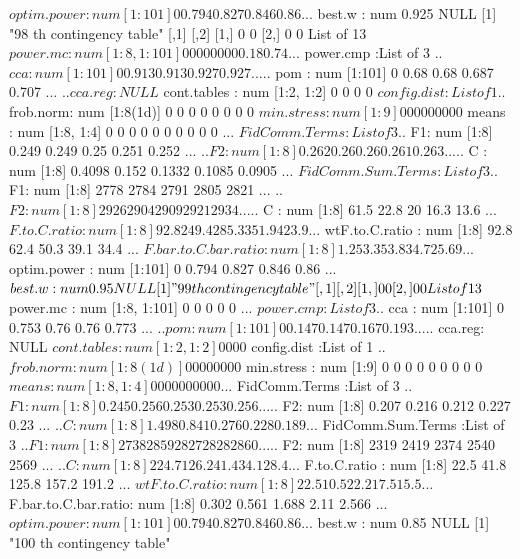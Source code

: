 \documentclass[11pt]{article} %
\begin{document}
\begin{Schunk}
\begin{Soutput}
 $ optim.power         : num [1:101] 0 0.794 0.827 0.846 0.86 ...
 $ best.w              : num 0.925
NULL
[1] "98 th contingency table"
     [,1] [,2]
[1,]    0    0
[2,]    0    0
List of 13
 $ power.mc            : num [1:8, 1:101] 0 0 0 0 0 0 0 0 0.18 0.74 ...
 $ power.cmp           :List of 3
  ..$ cca    : num [1:101] 0 0.913 0.913 0.927 0.927 ...
  ..$ pom    : num [1:101] 0 0.68 0.68 0.687 0.707 ...
  ..$ cca.reg: NULL
 $ cont.tables         : num [1:2, 1:2] 0 0 0 0
 $ config.dist         :List of 1
  ..$ frob.norm: num [1:8(1d)] 0 0 0 0 0 0 0 0
 $ min.stress          : num [1:9] 0 0 0 0 0 0 0 0 0
 $ means               : num [1:8, 1:4] 0 0 0 0 0 0 0 0 0 0 ...
 $ FidComm.Terms       :List of 3
  ..$ F1: num [1:8] 0.249 0.249 0.25 0.251 0.252 ...
  ..$ F2: num [1:8] 0.262 0.26 0.26 0.261 0.263 ...
  ..$ C : num [1:8] 0.4098 0.152 0.1332 0.1085 0.0905 ...
 $ FidComm.Sum.Terms   :List of 3
  ..$ F1: num [1:8] 2778 2784 2791 2805 2821 ...
  ..$ F2: num [1:8] 2926 2904 2909 2921 2934 ...
  ..$ C : num [1:8] 61.5 22.8 20 16.3 13.6 ...
 $ F.to.C.ratio        : num [1:8] 92.8 249.4 285.3 351.9 423.9 ...
 $ wtF.to.C.ratio      : num [1:8] 92.8 62.4 50.3 39.1 34.4 ...
 $ F.bar.to.C.bar.ratio: num [1:8] 1.25 3.35 3.83 4.72 5.69 ...
 $ optim.power         : num [1:101] 0 0.794 0.827 0.846 0.86 ...
 $ best.w              : num 0.95
NULL
[1] "99 th contingency table"
     [,1] [,2]
[1,]    0    0
[2,]    0    0
List of 13
 $ power.mc            : num [1:8, 1:101] 0 0 0 0 0 ...
 $ power.cmp           :List of 3
  ..$ cca    : num [1:101] 0 0.753 0.76 0.76 0.773 ...
  ..$ pom    : num [1:101] 0 0.147 0.147 0.167 0.193 ...
  ..$ cca.reg: NULL
 $ cont.tables         : num [1:2, 1:2] 0 0 0 0
 $ config.dist         :List of 1
  ..$ frob.norm: num [1:8(1d)] 0 0 0 0 0 0 0 0
 $ min.stress          : num [1:9] 0 0 0 0 0 0 0 0 0
 $ means               : num [1:8, 1:4] 0 0 0 0 0 0 0 0 0 0 ...
 $ FidComm.Terms       :List of 3
  ..$ F1: num [1:8] 0.245 0.256 0.253 0.253 0.256 ...
  ..$ F2: num [1:8] 0.207 0.216 0.212 0.227 0.23 ...
  ..$ C : num [1:8] 1.498 0.841 0.276 0.228 0.189 ...
 $ FidComm.Sum.Terms   :List of 3
  ..$ F1: num [1:8] 2738 2859 2827 2828 2860 ...
  ..$ F2: num [1:8] 2319 2419 2374 2540 2569 ...
  ..$ C : num [1:8] 224.7 126.2 41.4 34.1 28.4 ...
 $ F.to.C.ratio        : num [1:8] 22.5 41.8 125.8 157.2 191.2 ...
 $ wtF.to.C.ratio      : num [1:8] 22.5 10.5 22.2 17.5 15.5 ...
 $ F.bar.to.C.bar.ratio: num [1:8] 0.302 0.561 1.688 2.11 2.566 ...
 $ optim.power         : num [1:101] 0 0.794 0.827 0.846 0.86 ...
 $ best.w              : num 0.85
NULL
[1] "100 th contingency table"

\end{Soutput}
\end{Schunk}
\end{document}
